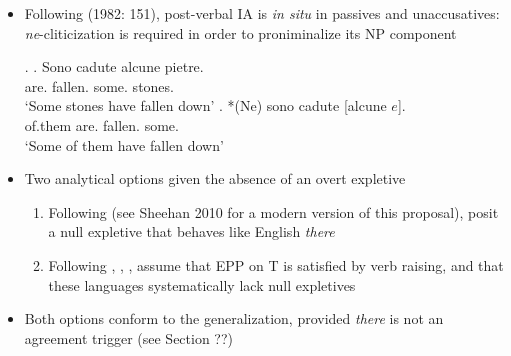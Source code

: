 \documentclass[letterpaper,10pt]{handout_nick}
\begin{document}
\begin{itemize}
\item Following \citeauthor{rizzi82} (1982: 151), post-verbal IA is \emph{in situ} in passives and unaccusatives: \emph{ne}-cliticization is required in order to proniminalize its NP component
\begin{multicols}{2}
\ex. \ag. Sono cadute alcune pietre. \\
are. fallen. some. stones.\\
`Some stones have fallen down'
\bg. *(Ne) sono cadute [alcune $e$].\\
{of.them} are. fallen. some. \\
`Some of them have fallen down'

\end{multicols}
\item Two analytical options given the absence of an overt expletive
\begin{enumerate}
\item Following \citet{chomsky81} (see Sheehan 2010 for a modern version of this proposal), posit a null expletive that behaves like English \emph{there}
\item Following \citealt{barbosa95}, \citealt{alexiadou98}, \citealt{biberauer10}, assume that EPP on T is satisfied by verb raising, and that these languages systematically lack null expletives 
\end{enumerate}
\item Both options conform to the generalization, provided \emph{there} is not an agreement trigger (see Section ??)
\end{itemize}
\end{document}
